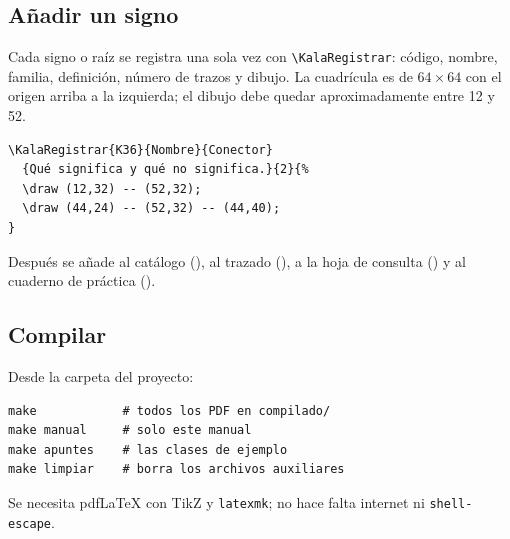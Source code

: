 \subsection{Añadir un signo}
Cada signo o raíz se registra una sola vez con \verb|\KalaRegistrar|: código, nombre,
familia, definición, número de trazos y dibujo. La cuadrícula es de
\(64\times64\) con el origen arriba a la izquierda; el dibujo debe quedar
aproximadamente entre 12 y 52.
\begin{Verbatim}[fontsize=\small,frame=single]
\KalaRegistrar{K36}{Nombre}{Conector}
  {Qué significa y qué no significa.}{2}{%
  \draw (12,32) -- (52,32);
  \draw (44,24) -- (52,32) -- (44,40);
}
\end{Verbatim}
Después se añade al catálogo (), al trazado
(), a la hoja de consulta () y al
cuaderno de práctica ().

\subsection{Compilar}
Desde la carpeta del proyecto:
\begin{Verbatim}[fontsize=\small,frame=single]
make            # todos los PDF en compilado/
make manual     # solo este manual
make apuntes    # las clases de ejemplo
make limpiar    # borra los archivos auxiliares
\end{Verbatim}
Se necesita pdf\LaTeX{} con TikZ y \texttt{latexmk}; no hace falta internet ni
\texttt{shell-escape}.
